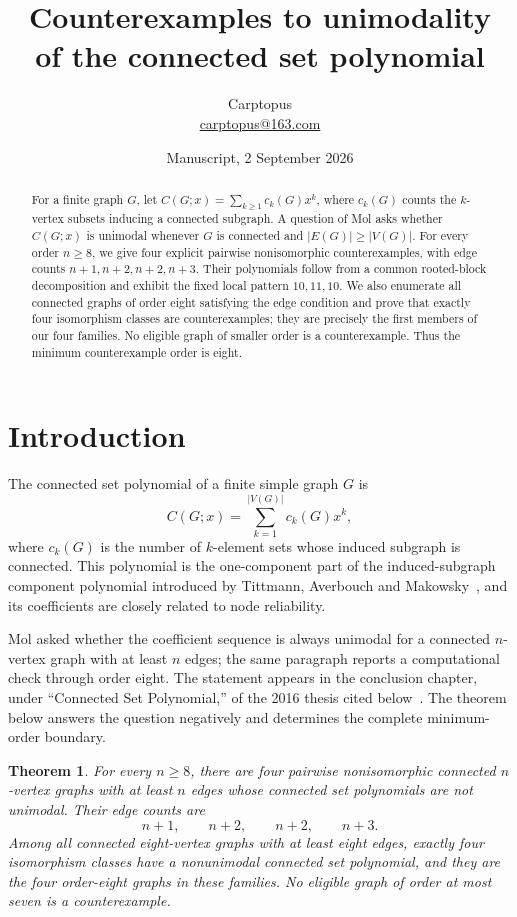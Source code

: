 \documentclass[11pt]{article}
\title{Counterexamples to unimodality\\of the connected set polynomial}
\author{Carptopus\\\href{mailto:carptopus@163.com}{carptopus@163.com}}
\date{Manuscript, 2 September 2026}
\newtheorem{theorem}{Theorem}
\numberwithin{equation}{section}
\begin{document}
\maketitle

\begin{abstract}
For a finite graph $G$, let $C(G;x)=\sum_{k\geq1}c_k(G)x^k$, where $c_k(G)$ counts the
$k$-vertex subsets inducing a connected subgraph. A question of Mol asks whether $C(G;x)$ is
unimodal whenever $G$ is connected and $|E(G)|\geq|V(G)|$. For every order $n\geq8$, we give
four explicit pairwise nonisomorphic counterexamples, with edge counts
$n+1,n+2,n+2,n+3$. Their polynomials follow from a common rooted-block decomposition and exhibit
the fixed local pattern $10,11,10$. We also enumerate all connected graphs of order eight
satisfying the edge condition and prove that exactly four isomorphism classes are counterexamples;
they are precisely the first members of our four families. No eligible graph of smaller order is a
counterexample. Thus the minimum counterexample order is eight.
\end{abstract}

\section{Introduction}

The connected set polynomial of a finite simple graph $G$ is
\begin{equation}
C(G;x)=\sum_{k=1}^{|V(G)|}c_k(G)x^k,
\end{equation}
where $c_k(G)$ is the number of $k$-element sets whose induced subgraph is connected. This
polynomial is the one-component part of the induced-subgraph component polynomial introduced by
Tittmann, Averbouch and Makowsky~\cite{tittmann}, and its coefficients are closely related to node
reliability.

Mol asked whether the coefficient sequence is always unimodal for a connected $n$-vertex graph
with at least $n$ edges; the same paragraph reports a computational check through order eight.
The statement appears in the conclusion chapter, under ``Connected Set Polynomial,'' of the 2016
thesis cited below~\cite{mol}. The theorem below answers the question negatively and determines the
complete minimum-order boundary.

\begin{theorem}\label{thm:main}
For every $n\geq8$, there are four pairwise nonisomorphic connected $n$-vertex graphs with at
least $n$ edges whose connected set polynomials are not unimodal. Their edge counts are
\[
n+1,\qquad n+2,\qquad n+2,\qquad n+3.
\]
Among all connected eight-vertex graphs with at least eight edges, exactly four isomorphism classes
have a nonunimodal connected set polynomial, and they are the four order-eight graphs in these
families. No eligible graph of order at most seven is a counterexample.
\end{theorem}
\end{document}
